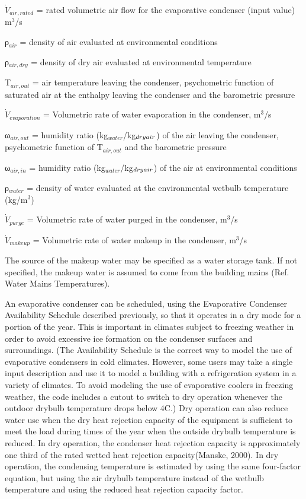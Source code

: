 \({\dot V_{air,rated}}\) = rated volumetric air flow for the evaporative condenser (input value) m\(^{3}\)/s

ρ\(_{air}\) = density of air evaluated at environmental conditions

ρ\(_{air,dry}\) = density of dry air evaluated at environmental temperature

T\(_{air,out}\) = air temperature leaving the condenser, psychometric function of saturated air at the enthalpy leaving the condenser and the barometric pressure

\({\dot V_{evaporation}}\) = Volumetric rate of water evaporation in the condenser, m\(^{3}\)/s

ω\(_{air,out}\) = humidity ratio (kg\(_{water}\)/kg\(_{dry\\ air}\)) of the air leaving the condenser, psychometric function of T\(_{air,out}\) and the barometric pressure

ω\(_{air,in}\) = humidity ratio (kg\(_{water}\)/kg\(_{dry\\ air}\)) of the air at environmental conditions

ρ\(_{water}\) = density of water evaluated at the environmental wetbulb temperature (kg/m\(^{3}\))

\({\dot V_{purge}}\) = Volumetric rate of water purged in the condenser, m\(^{3}\)/s

\({\dot V_{makeup}}\) = Volumetric rate of water makeup in the condenser, m\(^{3}\)/s

The source of the makeup water may be specified as a water storage tank. If not specified, the makeup water is assumed to come from the building mains (Ref. Water Mains Temperatures).

An evaporative condenser can be scheduled, using the Evaporative Condenser Availability Schedule described previously, so that it operates in a dry mode for a portion of the year. This is important in climates subject to freezing weather in order to avoid excessive ice formation on the condenser surfaces and surroundings. (The Availability Schedule is the correct way to model the use of evaporative condensers in cold climates. However, some users may take a single input description and use it to model a building with a refrigeration system in a variety of climates. To avoid modeling the use of evaporative coolers in freezing weather, the code includes a cutout to switch to dry operation whenever the outdoor drybulb temperature drops below 4C.) Dry operation can also reduce water use when the dry heat rejection capacity of the equipment is sufficient to meet the load during times of the year when the outside drybulb temperature is reduced. In dry operation, the condenser heat rejection capacity is approximately one third of the rated wetted heat rejection capacity(Manske, 2000). In dry operation, the condensing temperature is estimated by using the same four-factor equation, but using the air drybulb temperature instead of the wetbulb temperature and using the reduced heat rejection capacity factor.


